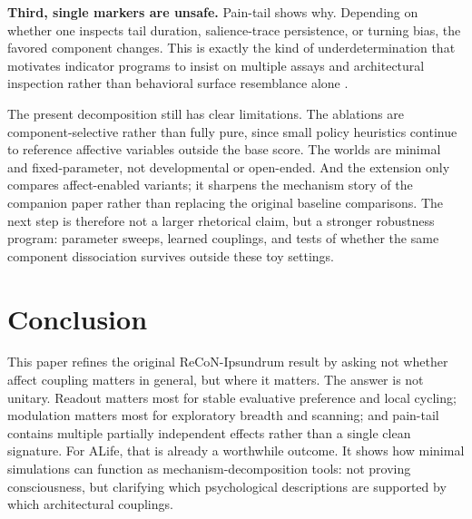 \documentclass[letterpaper]{article}
\begin{document}
\textbf{Third, single markers are unsafe.} Pain-tail shows why. Depending on whether one inspects tail duration, salience-trace persistence, or turning bias, the favored component changes. This is exactly the kind of underdetermination that motivates indicator programs to insist on multiple assays and architectural inspection rather than behavioral surface resemblance alone \citep{ButlinEtAl2025Indicators}.

The present decomposition still has clear limitations. The ablations are component-selective rather than fully pure, since small policy heuristics continue to reference affective variables outside the base score. The worlds are minimal and fixed-parameter, not developmental or open-ended. And the extension only compares affect-enabled variants; it sharpens the mechanism story of the companion paper rather than replacing the original baseline comparisons. The next step is therefore not a larger rhetorical claim, but a stronger robustness program: parameter sweeps, learned couplings, and tests of whether the same component dissociation survives outside these toy settings.

\section{Conclusion}
This paper refines the original ReCoN-Ipsundrum result by asking not whether affect coupling matters in general, but where it matters. The answer is not unitary. Readout matters most for stable evaluative preference and local cycling; modulation matters most for exploratory breadth and scanning; and pain-tail contains multiple partially independent effects rather than a single clean signature. For ALife, that is already a worthwhile outcome. It shows how minimal simulations can function as mechanism-decomposition tools: not proving consciousness, but clarifying which psychological descriptions are supported by which architectural couplings.



\end{document}
